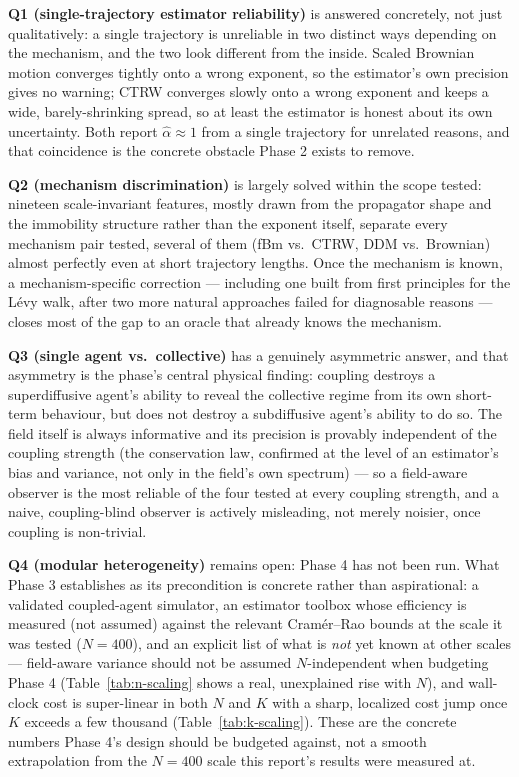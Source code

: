 \documentclass[11pt]{article}
\begin{document}
\textbf{Q1 (single-trajectory estimator reliability)} is answered concretely,
not just qualitatively: a single trajectory is unreliable in two distinct
ways depending on the mechanism, and the two look different from the inside.
Scaled Brownian motion converges tightly onto a wrong exponent, so the
estimator's own precision gives no warning; CTRW converges slowly onto a
wrong exponent and keeps a wide, barely-shrinking spread, so at least the
estimator is honest about its own uncertainty. Both report
$\hat\alpha\approx1$ from a single trajectory for unrelated reasons, and that
coincidence is the concrete obstacle Phase 2 exists to remove.

\textbf{Q2 (mechanism discrimination)} is largely solved within the scope
tested: nineteen scale-invariant features, mostly drawn from the propagator
shape and the immobility structure rather than the exponent itself, separate
every mechanism pair tested, several of them (fBm vs.\ CTRW, DDM vs.\
Brownian) almost perfectly even at short trajectory lengths. Once the
mechanism is known, a mechanism-specific correction --- including one built
from first principles for the L\'evy walk, after two more natural approaches
failed for diagnosable reasons --- closes most of the gap to an oracle that
already knows the mechanism.

\textbf{Q3 (single agent vs.\ collective)} has a genuinely asymmetric answer,
and that asymmetry is the phase's central physical finding: coupling
destroys a superdiffusive agent's ability to reveal the collective regime
from its own short-term behaviour, but does not destroy a subdiffusive
agent's ability to do so. The field itself is always informative and its
precision is provably independent of the coupling strength (the conservation
law, confirmed at the level of an estimator's bias and variance, not only in
the field's own spectrum) --- so a field-aware observer is the most reliable
of the four tested at every coupling strength, and a naive, coupling-blind
observer is actively misleading, not merely noisier, once coupling is
non-trivial.

\textbf{Q4 (modular heterogeneity)} remains open: Phase 4 has not been run.
What Phase 3 establishes as its precondition is concrete rather than
aspirational: a validated coupled-agent simulator, an estimator toolbox whose
efficiency is measured (not assumed) against the relevant Cram\'er--Rao
bounds at the scale it was tested ($N{=}400$), and an explicit list of what
is \emph{not} yet known at other scales --- field-aware variance should not
be assumed $N$-independent when budgeting Phase 4 (Table~\ref{tab:n-scaling}
shows a real, unexplained rise with $N$), and wall-clock cost is
super-linear in both $N$ and $K$ with a sharp, localized cost jump once $K$
exceeds a few thousand (Table~\ref{tab:k-scaling}). These are the concrete
numbers Phase 4's design should be budgeted against, not a smooth
extrapolation from the $N{=}400$ scale this report's results were measured
at.
\end{document}
